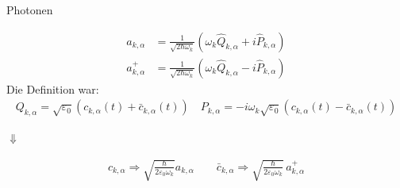 \documentclass{beamer}
\begin{document}
\begin{frame}[t]{Photonen}
	\vspace*{-0.5cm}
	\begin{center}
		\begin{minipage}{0.35\textwidth}
			\begin{align*}
			a_{k,\alpha} &= \frac{1}{\sqrt{2 \hbar \omega_k}} (\omega_k \hat{Q}_{k,\alpha} + i\hat{P}_{k,\alpha}) \\
			a^+_{k,\alpha} &= \frac{1}{\sqrt{2 \hbar \omega_k}} (\omega_k \hat{Q}_{k,\alpha} - i\hat{P}_{k,\alpha})
			\end{align*}
			Die Definition war:
			\begin{align*}
			Q_{k,\alpha} = \sqrt{\varepsilon_0} \left(c_{k,\alpha}(t) + \bar{c}_{k,\alpha}(t)\right) \quad P_{k,\alpha} = -i \omega_k \sqrt{\varepsilon_0} \left(c_{k,\alpha}(t) - \bar{c}_{k,\alpha}(t)\right) 
			\end{align*}
		\end{minipage}
		
		\vspace*{0.5cm}
		$\Downarrow$
		
		\begin{minipage}{0.35\textwidth}
			\begin{align*}
			c_{k,\alpha} \Rightarrow \sqrt{\frac{\hbar}{2 \varepsilon_0 \omega_k}} a_{k,\alpha} \qquad 
			\bar{c}_{k,\alpha} \Rightarrow \sqrt{\frac{\hbar}{2 \varepsilon_0 \omega_k}} \, a^+_{k,\alpha}
			\end{align*}
		\end{minipage}
	\end{center}
\end{frame}
\end{document}
